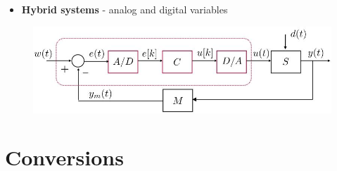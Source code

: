\documentclass[conference]{IEEEtran}
\begin{document}
\begin{itemize}
    \item \textbf{Hybrid systems} - analog and digital variables 
\end{itemize}
\begin{figure} [h!]
    \centering
    \includegraphics[scale=0.5]{Ex2.JPG}
\end{figure}

\pagebreak
\section{Conversions}
\end{document}
